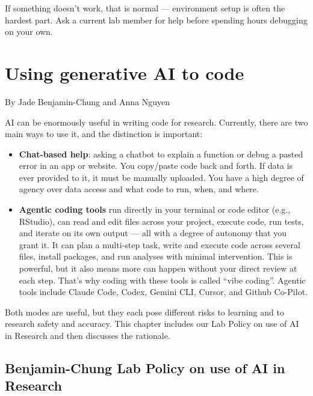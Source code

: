 \documentclass[
]{book}
\providecommand{\tightlist}{%
  \setlength{\itemsep}{0pt}\setlength{\parskip}{0pt}}
\begin{document}
If something doesn't work, that is normal --- environment setup is often the hardest part. Ask a current lab member for help before spending hours debugging on your own.

\chapter{Using generative AI to code}\label{using-generative-ai-to-code}

By Jade Benjamin-Chung and Anna Nguyen

AI can be enormously useful in writing code for research. Currently,
there are two main ways to use it, and the distinction is important:

\begin{itemize}
\tightlist
\item
  \textbf{Chat-based help}: asking a chatbot to explain a function or debug a
  pasted error in an app or website. You copy/paste code back and forth.
  If data is ever provided to it, it must be manually uploaded. You have
  a high degree of agency over data access and what code to run, when,
  and where.
\item
  \textbf{Agentic coding tools} run directly in your terminal or code editor
  (e.g., RStudio), can read and edit files across your project, execute
  code, run tests, and iterate on its own output --- all with a degree of
  autonomy that you grant it. It can plan a multi-step task, write and
  execute code across several files, install packages, and run analyses
  with minimal intervention. This is powerful, but it also means more
  can happen without your direct review at each step. That's why coding
  with these tools is called ``vibe coding''. Agentic tools include Claude
  Code, Codex, Gemini CLI, Cursor, and Github Co-Pilot.
\end{itemize}

Both modes are useful, but they each pose different risks to learning
and to research safety and accuracy. This chapter includes our Lab
Policy on use of AI in Research and then discusses the rationale.

\section{Benjamin-Chung Lab Policy on use of AI in Research}\label{benjamin-chung-lab-policy-on-use-of-ai-in-research}
\end{document}
